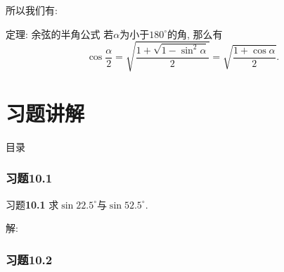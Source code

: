 \documentclass[serif]{beamer}
\begin{document}
\begin{frame}
	所以我们有:
	\begin{block}{{\heiti 定理}: {\fangsong 余弦的半角公式}}
		\kaishu
		若$\alpha$为小于$180^\circ$的角, 那么有
		\[\cos\frac\alpha2=\sqrt{\frac{1+\sqrt{1-\sin^2\alpha}}{2}}=\sqrt{\frac{1+\cos\alpha}{2}}.\]
	\end{block}
\end{frame}

\part{\heiti\hspace*{\fill}\hspace*{3cm}习\hspace{\fill}题\hspace{\fill}讲\hspace{\fill}解\hspace{\fill}\hspace{3cm}}

\begin{frame}
	\partpage
\end{frame}

\begin{frame}{\heiti 目录}
	\tableofcontents
\end{frame}

\section{\heiti 习题\textbf{10.1}}

\begin{frame}{\heiti 习题\textbf{10.1}}
	\kaishu 求$\sin 22.5^\circ$与$\sin 52.5^\circ$.\par
	\songti 解:\vspace{5cm}
\end{frame}

\section{\heiti 习题\textbf{10.2}}
\end{document}

